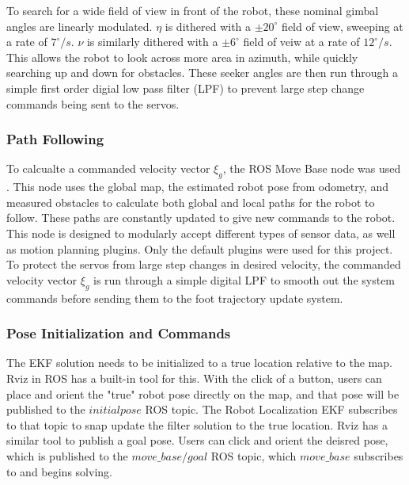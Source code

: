 To search for a wide field of view in front of the robot, these nominal gimbal angles are linearly modulated. $\eta$ is dithered with a $\pm 20^{\circ}$ field of view, sweeping at a rate of $7^{\circ}/s$. $\nu$ is similarly dithered with a $\pm 6^{\circ}$ field of veiw at a rate of $12^{\circ}/s$. This allows the robot to look across more area in azimuth, while quickly searching up and down for obstacles. These seeker angles are then run through a simple first order digial low pass filter (LPF) to prevent large step change commands being sent to the servos. 

\subsubsection{ Path Following }

To calcualte a commanded velocity vector $\xi_g$, the ROS Move Base node was used \cite{movebase}. This node uses the global map, the estimated robot pose from odometry, and measured obstacles to calculate both global and local paths for the robot to follow. These paths are constantly updated to give new commands to the robot. This node is designed to modularly accept different types of sensor data, as well as motion planning plugins. Only the default plugins were used for this project. To protect the servos from large step changes in desired velocity, the commanded velocity vector $\xi_g$ is run through a simple digital LPF to smooth out the system commands before sending them to the foot trajectory update system. 

\subsubsection{ Pose Initialization and Commands }

The EKF solution needs to be initialized to a true location relative to the map. Rviz in ROS \cite{rviz} has a built-in tool for this. With the click of a button, users can place and orient the "true" robot pose directly on the map, and that pose will be published to the $initialpose$ ROS topic. The Robot Localization EKF subscribes to that topic to snap update the filter solution to the true location. Rviz has a similar tool to publish a goal pose. Users can click and orient the deisred pose, which is published to the $move\_base/goal$ ROS topic, which $move\_base$ subscribes to and begins solving. 
